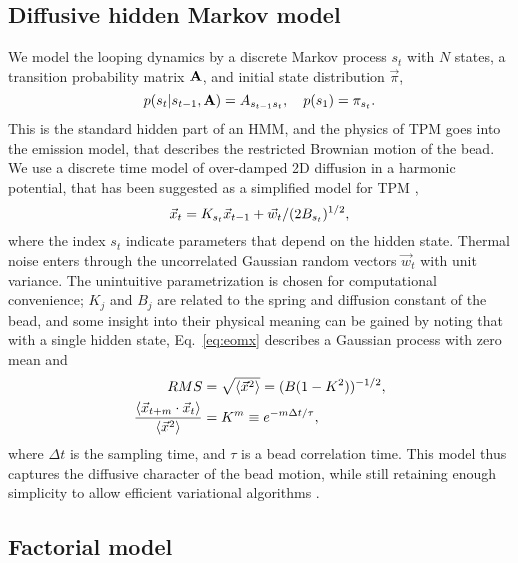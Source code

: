 \subsection{Diffusive hidden Markov model}
We model the looping dynamics by a discrete Markov process $s_t$ with
$N$ states, a transition probability matrix $\mathbf{A}$, and initial
state distribution $\vec{\pi}$,
\begin{equation}\label{eq:eoms}
  p(s_t|s_{t-1},\mathbf{A})=A_{s_{t-1}s_t},\quad p(s_1)=\pi_{s_t}.
\end{equation}
This is the standard hidden part of an HMM, and the physics of TPM
goes into the emission model, that describes the restricted Brownian
motion of the bead. We use a discrete time model of over-damped 2D
diffusion in a harmonic potential, that has been suggested as a
simplified model for TPM \cite{beausang2007b,lindner2013},
\begin{equation}\label{eq:eomx}
  \vec{x}_t=K_{s_t}\vec{x}_{t-1}+\vec{w}_t/(2B_{s_t})^{1/2},
\end{equation}
where the index $s_t$ indicate parameters that depend on the hidden
state.  Thermal noise enters through the uncorrelated Gaussian random
vectors $\vec{w}_t$ with unit variance. The unintuitive
parametrization is chosen for computational convenience; $K_j$ and
$B_j$ are related to the spring and diffusion constant of the bead,
and some insight into their physical meaning can be gained by noting
that with a single hidden state, Eq.~\ref{eq:eomx} describes a
Gaussian process with zero mean and
\begin{align}
RMS&=\sqrt{\left\langle \vec{x}^2\right\rangle}=(B(1-K^2))^{-1/2},\nonumber\\
\frac{\left\langle \vec{x}_{t+m}\cdot\vec{x}_t\right\rangle}{\left\langle \vec{x}^2\right\rangle}&
=K^m\equiv e^{-m\Delta t/\tau},\label{eq:1state}
\end{align}
where $\Delta t$ is the sampling time, and $\tau$ is a bead
correlation time.  This model thus captures the diffusive character of
the bead motion, while still retaining enough simplicity to allow
efficient variational algorithms
\cite{mackay1997,bishop2006}.

\subsection{Factorial model}
\cite{vbTPM_model:describefactorialmodel}
